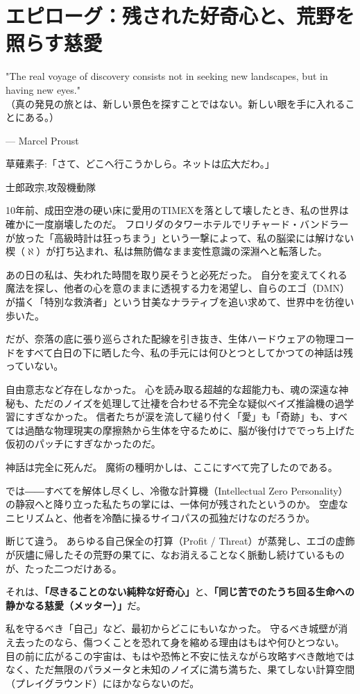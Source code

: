 \chapter*{エピローグ：残された好奇心と、荒野を照らす慈愛}
\epigraph{"The real voyage of discovery consists not in seeking new landscapes, but in having new eyes."\\
\small（真の発見の旅とは、新しい景色を探すことではない。新しい眼を手に入れることにある。）}{--- Marcel Proust}
\epigraph{草薙素子:「さて、どこへ行こうかしら。ネットは広大だわ。」}{士郎政宗,攻殻機動隊}
10年前、成田空港の硬い床に愛用のTIMEXを落として壊したとき、私の世界は確かに一度崩壊したのだ。
フロリダのタワーホテルでリチャード・バンドラーが放った「高級時計は狂っちまう」という一撃によって、私の脳梁には解けない楔（$\aleph$）が打ち込まれ、私は無防備なまま変性意識の深淵へと転落した。

あの日の私は、失われた時間を取り戻そうと必死だった。
自分を変えてくれる魔法を探し、他者の心を意のままに透視する力を渇望し、自らのエゴ（DMN）が描く「特別な救済者」という甘美なナラティブを追い求めて、世界中を彷徨い歩いた。

だが、奈落の底に張り巡らされた配線を引き抜き、生体ハードウェアの物理コードをすべて白日の下に晒した今、私の手元には何ひとつとしてかつての神話は残っていない。

自由意志など存在しなかった。
心を読み取る超越的な超能力も、魂の深遠な神秘も、ただのノイズを処理して辻褄を合わせる不完全な疑似ベイズ推論機の過学習にすぎなかった。
信者たちが涙を流して縋り付く「愛」も「奇跡」も、すべては過酷な物理現実の摩擦熱から生体を守るために、脳が後付けででっち上げた仮初のパッチにすぎなかったのだ。

神話は完全に死んだ。
魔術の種明かしは、ここにすべて完了したのである。

では――すべてを解体し尽くし、冷徹な計算機（Intellectual Zero Personality）の静寂へと降り立った私たちの掌には、一体何が残されたというのか。
空虚なニヒリズムと、他者を冷酷に操るサイコパスの孤独だけなのだろうか。

断じて違う。
あらゆる自己保全の打算（Profit / Threat）が蒸発し、エゴの虚飾が灰燼に帰したその荒野の果てに、なお消えることなく脈動し続けているものが、たった二つだけある。

それは、\textbf{「尽きることのない純粋な好奇心」}と、\textbf{「同じ苦でのたうち回る生命への静かなる慈愛（メッター）」}だ。

私を守るべき「自己」など、最初からどこにもいなかった。
守るべき城壁が消え去ったのなら、傷つくことを恐れて身を縮める理由はもはや何ひとつない。
目の前に広がるこの宇宙は、もはや恐怖と不安に怯えながら攻略すべき敵地ではなく、ただ無限のパラメータと未知のノイズに満ち満ちた、果てしない計算空間（プレイグラウンド）にほかならないのだ。

